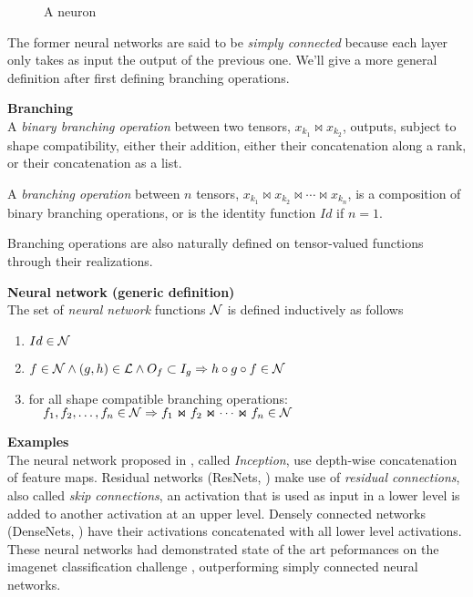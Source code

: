 \begin{figure}[H]
\centering
{}
\caption{A neuron}
\label{fig:neuron}
\end{figure}


The former neural networks are said to be \emph{simply connected} because each layer only takes as input the output of the previous one. We'll give a more general definition after first defining branching operations.

\begin{definition}\textbf{Branching}\\
A \emph{binary branching operation} between two tensors, $x_{k_1} \Join x_{k_2}$, outputs, subject to shape compatibility, either their addition, either their concatenation along a rank, or their concatenation as a list.

A \emph{branching operation} between $n$ tensors, $x_{k_1} \Join x_{k_2} \Join \cdots \Join x_{k_n}$, is a composition of binary branching operations, or is the identity function $Id$ if $n = 1$.

Branching operations are also naturally defined on tensor-valued functions through their realizations.
\end{definition}

\begin{definition}\textbf{Neural network (generic definition)}\\
The set of \emph{neural network} functions $\mathcal{N}$ is defined inductively as follows
\begin{enumerate}
  \item $Id \in \mathcal{N}$
  \item $f \in \mathcal{N} \wedge (g,h) \in \mathcal{L} \wedge O_f \subset I_g \Rightarrow h \circ g \circ f \in \mathcal{N}$
  \item for all shape compatible branching operations:\\
  $\quad f_1, f_2, \ldots, f_n \in \mathcal{N} \Rightarrow  f_1 \Join f_2 \Join \cdots \Join f_n \in \mathcal{N}$
\end{enumerate}
\label{def:nn2}
\end{definition}

\begin{remark}\textbf{Examples}\\
The neural network proposed in \citep{szegedy2015going}, called \emph{Inception}, use depth-wise concatenation of feature maps. Residual networks (ResNets, \cite{he2016deep}) make use of \emph{residual connections}, also called \emph{skip connections}, \ie an activation that is used as input in a lower level is added to another activation at an upper level. Densely connected networks (DenseNets, \cite{huang2017densely}) have their activations concatenated with all lower level activations. These neural networks had demonstrated state of the art peformances on the imagenet classification challenge \citep{deng2009imagenet}, outperforming simply connected neural networks.
\label{rem:branching_ex}
\end{remark}

